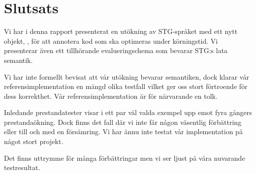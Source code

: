 \documentclass[Rapport]{subfiles}
\begin{document}
\section{Slutsats}
\label{sec:Slutsats}






Vi har i denna rapport presenterat en utökning av STG-språket med ett nytt objekt, , för att annotera kod som ska optimeras under körningstid. Vi presenterar även ett tillhörande evalueringschema som bevarar STG:s lata semantik. 

Vi har inte formellt bevisat att vår utökning bevarar semantiken, dock klarar vår referensimplementation en mängd olika testfall vilket ger oss stort förtroende för dess korrekthet. Vår referensimplementation är för närvarande en tolk. 

Inledande prestandatester visar i ett par väl valda exempel upp emot fyra gångers prestandaökning. Dock finns det fall där vi inte får någon väsentlig förbättring eller till och med en försämring. Vi har ännu inte testat vår implementation på något stort projekt. 

Det finns uttrymme för många förbättringar men vi ser ljust på våra nuvarande testresultat.





\end{document}
